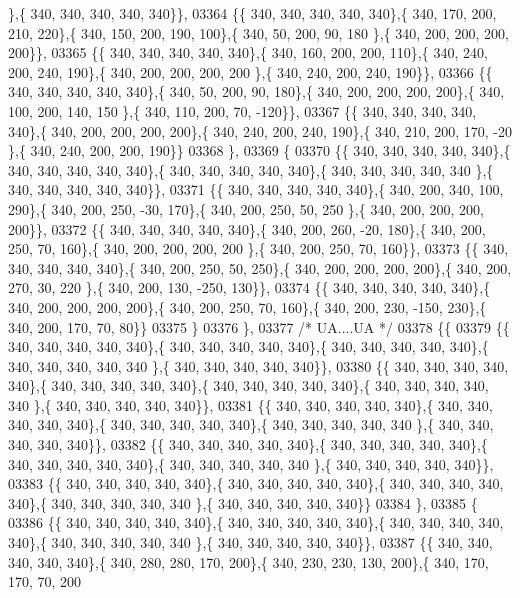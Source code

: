 \begin{DoxyCode}
      \},\{ 340, 340, 340, 340, 340\}\},
03364 \{\{ 340, 340, 340, 340, 340\},\{ 340, 170, 200, 210, 220\},\{ 340, 150, 200, 190, 100\},\{ 340,  50, 200,  90, 180
      \},\{ 340, 200, 200, 200, 200\}\},
03365 \{\{ 340, 340, 340, 340, 340\},\{ 340, 160, 200, 200, 110\},\{ 340, 240, 200, 240, 190\},\{ 340, 200, 200, 200, 200
      \},\{ 340, 240, 200, 240, 190\}\},
03366 \{\{ 340, 340, 340, 340, 340\},\{ 340,  50, 200,  90, 180\},\{ 340, 200, 200, 200, 200\},\{ 340, 100, 200, 140, 150
      \},\{ 340, 110, 200,  70, -120\}\},
03367 \{\{ 340, 340, 340, 340, 340\},\{ 340, 200, 200, 200, 200\},\{ 340, 240, 200, 240, 190\},\{ 340, 210, 200, 170, -20
      \},\{ 340, 240, 200, 200, 190\}\}
03368 \},
03369 \{
03370 \{\{ 340, 340, 340, 340, 340\},\{ 340, 340, 340, 340, 340\},\{ 340, 340, 340, 340, 340\},\{ 340, 340, 340, 340, 340
      \},\{ 340, 340, 340, 340, 340\}\},
03371 \{\{ 340, 340, 340, 340, 340\},\{ 340, 200, 340, 100, 290\},\{ 340, 200, 250, -30, 170\},\{ 340, 200, 250,  50, 250
      \},\{ 340, 200, 200, 200, 200\}\},
03372 \{\{ 340, 340, 340, 340, 340\},\{ 340, 200, 260, -20, 180\},\{ 340, 200, 250,  70, 160\},\{ 340, 200, 200, 200, 200
      \},\{ 340, 200, 250,  70, 160\}\},
03373 \{\{ 340, 340, 340, 340, 340\},\{ 340, 200, 250,  50, 250\},\{ 340, 200, 200, 200, 200\},\{ 340, 200, 270,  30, 220
      \},\{ 340, 200, 130, -250, 130\}\},
03374 \{\{ 340, 340, 340, 340, 340\},\{ 340, 200, 200, 200, 200\},\{ 340, 200, 250,  70, 160\},\{ 340, 200, 230, -150, 
      230\},\{ 340, 200, 170,  70,  80\}\}
03375 \}
03376 \},
03377 \textcolor{comment}{/* UA....UA */}
03378 \{\{
03379 \{\{ 340, 340, 340, 340, 340\},\{ 340, 340, 340, 340, 340\},\{ 340, 340, 340, 340, 340\},\{ 340, 340, 340, 340, 340
      \},\{ 340, 340, 340, 340, 340\}\},
03380 \{\{ 340, 340, 340, 340, 340\},\{ 340, 340, 340, 340, 340\},\{ 340, 340, 340, 340, 340\},\{ 340, 340, 340, 340, 340
      \},\{ 340, 340, 340, 340, 340\}\},
03381 \{\{ 340, 340, 340, 340, 340\},\{ 340, 340, 340, 340, 340\},\{ 340, 340, 340, 340, 340\},\{ 340, 340, 340, 340, 340
      \},\{ 340, 340, 340, 340, 340\}\},
03382 \{\{ 340, 340, 340, 340, 340\},\{ 340, 340, 340, 340, 340\},\{ 340, 340, 340, 340, 340\},\{ 340, 340, 340, 340, 340
      \},\{ 340, 340, 340, 340, 340\}\},
03383 \{\{ 340, 340, 340, 340, 340\},\{ 340, 340, 340, 340, 340\},\{ 340, 340, 340, 340, 340\},\{ 340, 340, 340, 340, 340
      \},\{ 340, 340, 340, 340, 340\}\}
03384 \},
03385 \{
03386 \{\{ 340, 340, 340, 340, 340\},\{ 340, 340, 340, 340, 340\},\{ 340, 340, 340, 340, 340\},\{ 340, 340, 340, 340, 340
      \},\{ 340, 340, 340, 340, 340\}\},
03387 \{\{ 340, 340, 340, 340, 340\},\{ 340, 280, 280, 170, 200\},\{ 340, 230, 230, 130, 200\},\{ 340, 170, 170,  70, 200

\end{DoxyCode}
